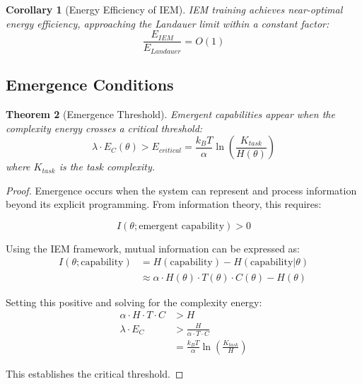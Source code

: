 \documentclass[12pt]{article}
\newtheorem{theorem}{Theorem}
\newtheorem{corollary}[theorem]{Corollary}
\begin{document}
\begin{corollary}[Energy Efficiency of IEM]
IEM training achieves near-optimal energy efficiency, approaching the Landauer limit within a constant factor:
\begin{equation}
\frac{E_{IEM}}{E_{Landauer}} = O(1)
\end{equation}
\end{corollary}

\subsection{Emergence Conditions}

\begin{theorem}[Emergence Threshold]
\label{thm:emergence}
Emergent capabilities appear when the complexity energy crosses a critical threshold:
\begin{equation}
\lambda \cdot E_C(\theta) > E_{critical} = \frac{k_B T}{\alpha} \ln\left(\frac{K_{task}}{H(\theta)}\right)
\end{equation}
where $K_{task}$ is the task complexity.
\end{theorem}

\begin{proof}
Emergence occurs when the system can represent and process information beyond its explicit programming. From information theory, this requires:

\begin{equation}
I(\theta; \text{emergent capability}) > 0
\end{equation}

Using the IEM framework, mutual information can be expressed as:
\begin{align}
I(\theta; \text{capability}) &= H(\text{capability}) - H(\text{capability}|\theta) \\
&\approx \alpha \cdot H(\theta) \cdot T(\theta) \cdot C(\theta) - H(\theta)
\end{align}

Setting this positive and solving for the complexity energy:
\begin{align}
\alpha \cdot H \cdot T \cdot C &> H \\
\lambda \cdot E_C &> \frac{H}{\alpha \cdot T \cdot C} \\
&= \frac{k_B T}{\alpha} \ln\left(\frac{K_{task}}{H}\right)
\end{align}

This establishes the critical threshold.
\end{proof}
\end{document}
